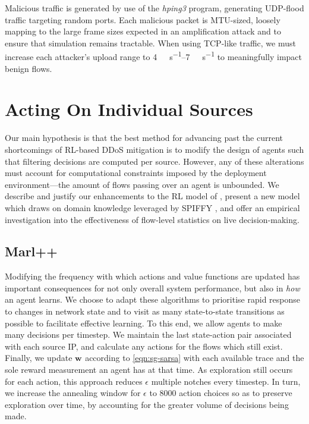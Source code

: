 \documentclass[conference, letterpaper, 10pt, times]{IEEEtran}
\newcommand{\wvec}[1]{\ensuremath{\bm{w}_{#1}}}
\newcommand{\fakepara}[1]{\noindent\textbf{#1:}}
\begin{document}
Malicious traffic is generated by use of the \emph{hping3} program, generating UDP-flood traffic targeting random ports.
Each malicious packet is MTU-sized, loosely mapping to the large frame sizes expected in an amplification attack and to ensure that simulation remains tractable.
When using TCP-like traffic, we must increase each attacker's upload range to \SIrange{4}{7}{\mega\bit\per\second} to meaningfully impact benign flows.

\section{Acting On Individual Sources}
Our main hypothesis is that the best method for advancing past the current shortcomings of RL-based DDoS mitigation is to modify the design of agents such that filtering decisions are computed per source.
However, any of these alterations must account for computational constraints imposed by the deployment environment---the amount of flows passing over an agent is unbounded.
We describe and justify our enhancements to the RL model of \textcite{DBLP:journals/eaai/MalialisK15}, present a new model which draws on domain knowledge leveraged by SPIFFY \cite{DBLP:conf/ndss/KangGS16}, and offer an empirical investigation into the effectiveness of flow-level statistics on live decision-making.

\subsection{Marl++}\label{sec:marl-plus}
Modifying the frequency with which actions and value functions are updated has important consequences for not only overall system performance, but also in \emph{how} an agent learns.
We choose to adapt these algorithms to prioritise rapid response to changes in network state and to visit as many state-to-state transitions as possible to facilitate effective learning.
To this end, we allow agents to make many decisions per timestep.
We maintain the last state-action pair associated with each source IP, and calculate any actions for the flows which still exist.
Finally, we update $\wvec{}$ according to \cref{eqn:sg-sarsa} with each available trace and the sole reward measurement an agent has at that time.
As exploration still occurs for each action, this approach reduces $\epsilon$ multiple notches every timestep.
In turn, we increase the annealing window for $\epsilon$ to \num{8000} action choices so as to preserve exploration over time, by accounting for the greater volume of decisions being made.
\end{document}
